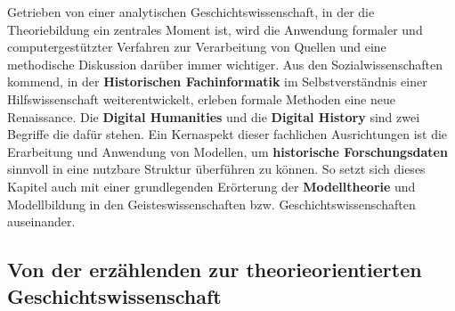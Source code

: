 \documentclass[12pt,a4paper]{article}
\begin{document}
Getrieben von einer analytischen Geschichtswissenschaft, in der die Theoriebildung ein zentrales Moment ist, wird die Anwendung formaler und computergestützter Verfahren zur Verarbeitung von Quellen und eine methodische Diskussion darüber immer wichtiger. Aus den Sozialwissenschaften kommend, in der \textbf{Historischen Fachinformatik} im Selbstverständnis einer Hilfswissenschaft weiterentwickelt, erleben formale Methoden eine neue Renaissance. Die \textbf{Digital Humanities} und die \textbf{Digital History} sind zwei Begriffe die dafür stehen. Ein Kernaspekt dieser fachlichen Ausrichtungen ist die Erarbeitung und Anwendung von Modellen, um \textbf{historische Forschungsdaten} sinnvoll in eine nutzbare  Struktur überführen zu können. So setzt sich dieses Kapitel auch mit einer grundlegenden Erörterung der \textbf{Modelltheorie} und Modellbildung in den Geisteswissenschaften bzw. Geschichtswissenschaften auseinander.

\subsection{Von der erzählenden zur theorieorientierten Geschichtswissenschaft}
\end{document}
